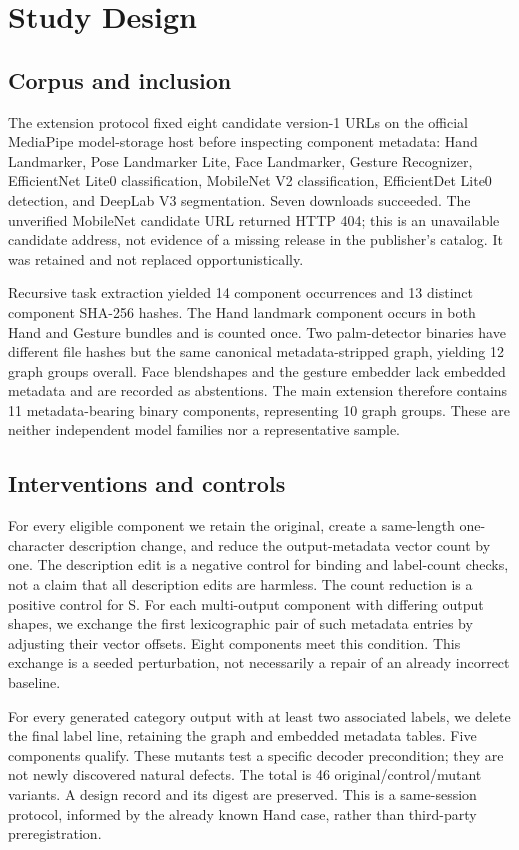 \documentclass[10pt,twocolumn,letterpaper]{article}
\begin{document}
\section{Study Design}
\subsection{Corpus and inclusion}
The extension protocol fixed eight candidate version-1 URLs on the official MediaPipe model-storage host before inspecting component metadata: Hand Landmarker, Pose Landmarker Lite, Face Landmarker, Gesture Recognizer, EfficientNet Lite0 classification, MobileNet V2 classification, EfficientDet Lite0 detection, and DeepLab V3 segmentation. Seven downloads succeeded. The unverified MobileNet candidate URL returned HTTP 404; this is an unavailable candidate address, not evidence of a missing release in the publisher's catalog. It was retained and not replaced opportunistically.

Recursive task extraction yielded 14 component occurrences and 13 distinct component SHA-256 hashes. The Hand landmark component occurs in both Hand and Gesture bundles and is counted once. Two palm-detector binaries have different file hashes but the same canonical metadata-stripped graph, yielding 12 graph groups overall. Face blendshapes and the gesture embedder lack embedded metadata and are recorded as abstentions. The main extension therefore contains 11 metadata-bearing binary components, representing 10 graph groups. These are neither independent model families nor a representative sample.

\subsection{Interventions and controls}
For every eligible component we retain the original, create a same-length one-character description change, and reduce the output-metadata vector count by one. The description edit is a negative control for binding and label-count checks, not a claim that all description edits are harmless. The count reduction is a positive control for S. For each multi-output component with differing output shapes, we exchange the first lexicographic pair of such metadata entries by adjusting their vector offsets. Eight components meet this condition. This exchange is a seeded perturbation, not necessarily a repair of an already incorrect baseline.

For every generated category output with at least two associated labels, we delete the final label line, retaining the graph and embedded metadata tables. Five components qualify. These mutants test a specific decoder precondition; they are not newly discovered natural defects. The total is 46 original/control/mutant variants. A design record and its digest are preserved. This is a same-session protocol, informed by the already known Hand case, rather than third-party preregistration.
\end{document}
